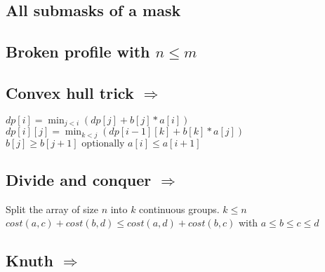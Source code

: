 
\subsection{All submasks of a mask }


\subsection{Broken profile  with $n \leq m$}


\subsection{Convex hull trick  $\Rightarrow$ }

$ dp[i] = \min_{j < i}(dp[j] + b[j] * a[i]) $ \\
$ dp[i][j] = \min_{k < j}(dp[i - 1][k] + b[k] * a[j]) $ \\
$ b[j] \geq b[j + 1] \text{ optionally } a[i] \leq a[i + 1] $ \\ 

\subsection{Divide and conquer  $\Rightarrow$ }

Split the array of size $n$ into $k$ continuous groups. $k \leq n$ \\
$ cost(a, c) + cost(b, d) \leq cost(a, d) + cost(b, c)$ with $a \leq b \leq c \leq d$ \\

\subsection{Knuth  $\Rightarrow$ }



